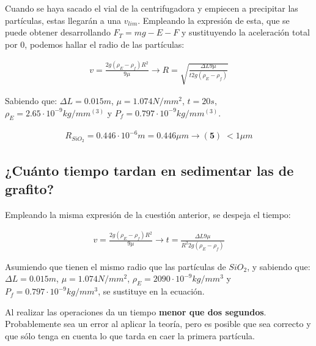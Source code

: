 \documentclass[]{scrartcl}
\begin{document}
Cuando se haya sacado el vial de la centrifugadora y empiecen a precipitar las partículas, estas llegarán a una $v_{lim}$. Empleando la expresión de esta, que se puede obtener desarrollando $F_{T}=mg-E-F$ y sustituyendo la aceleración total por 0, podemos hallar el radio de las partículas:

\begin{gather*}
     v=\frac{2g(\rho _{E}-\rho _{f})R^{2}}{9\mu}\rightarrow
     R=\sqrt{\frac{\Delta L9\mu}{t2g(\rho _{E}-\rho _{f})}}
\end{gather*}

Sabiendo que: $\Delta L = 0.015m$, $\mu = 1.074 N/mm^{2}$, $t = 20s$, $\rho _{E} = 2.65\cdot10^{-9} kg/mm^(3)$ y $P_{f} = 0.797\cdot10^{-9} kg/mm^(3)$.

\begin{gather*}
    R_{SiO_{2}} = 0.446\cdot 10^{-6} m = 0.446 \mu m \rightarrow \boxed{\mathbf{(5)}\; < 1 \mu m}
\end{gather*}

\subsection{¿Cuánto tiempo tardan en sedimentar las de grafito?}

Empleando la misma expresión de la cuestión anterior, se despeja el tiempo:

\begin{gather*}
    v=\frac{2g(\rho _{E}-\rho _{f})R^{2}}{9\mu}\rightarrow t=\frac{\Delta L9\mu}{R^{2}2g(\rho _{E}-\rho _{f})}
\end{gather*}

Asumiendo que tienen el mismo radio que las partículas de $SiO_{2}$, y sabiendo que: $\Delta L = 0.015m$, $\mu = 1.074 N/mm^{2}$, $\rho _{E} = 2090\cdot10^{-9} kg/mm^{3}$ y $P_{f} = 0.797\cdot10^{-9} kg/mm^{3}$, se sustituye en la ecuación.

Al realizar las operaciones da un tiempo \textbf{menor que dos segundos}. Probablemente sea un error al aplicar la teoría, pero es posible que sea correcto y que sólo tenga en cuenta lo que tarda en caer la primera partícula.
\end{document}
